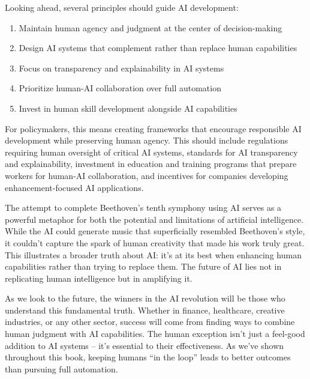 \documentclass[
  Letterpaper,
]{scrbook}
\providecommand{\tightlist}{%
  \setlength{\itemsep}{0pt}\setlength{\parskip}{0pt}}\usepackage{longtable,booktabs,array}
\begin{document}
Looking ahead, several principles should guide AI development:

\begin{enumerate}
\def\labelenumi{\arabic{enumi}.}
\tightlist
\item
  Maintain human agency and
  judgment at the center of
  decision-making
\item
  Design AI systems that complement rather than replace human
  capabilities
\item
  Focus on transparency and
  explainability in AI systems
\item
  Prioritize human-AI
  collaboration over
  full automation
\item
  Invest in human skill development alongside AI capabilities
\end{enumerate}

For policymakers, this means creating frameworks that encourage
responsible AI development while preserving human agency. This should
include regulations requiring human oversight of critical AI systems,
standards for AI transparency and explainability, investment in
education and training programs that prepare workers
for human-AI collaboration, and incentives for companies developing
enhancement-focused AI applications.

The attempt to complete Beethoven's tenth
symphony using AI serves
as a powerful metaphor for both the potential and limitations of
artificial intelligence. While the AI could generate music that
superficially resembled Beethoven's style, it couldn't capture the spark
of human creativity that made his work truly great. This illustrates a
broader truth about AI: it's at its best when enhancing human
capabilities rather than trying to replace them. The future of AI lies
not in replicating human intelligence but in amplifying it.

As we look to the future, the winners in the AI revolution will be those
who understand this fundamental truth. Whether in finance, healthcare,
creative industries, or any other sector,
success will come from finding ways to combine human judgment with AI
capabilities. The human
exception isn't just a
feel-good addition to AI systems -- it's essential to their
effectiveness. As we've shown throughout this book, keeping humans ``in
the loop'' leads to better outcomes than pursuing full automation.
\end{document}
